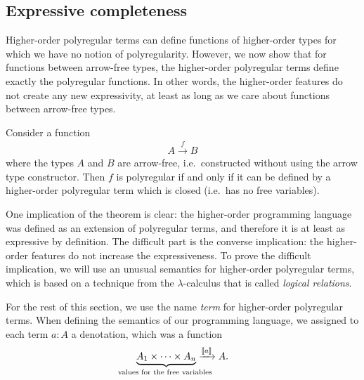 \subsection{Expressive completeness}
\label{sec:expressive-completeness}
Higher-order polyregular terms can define functions of higher-order types for which we have no notion of polyregularity. However, we now show that for functions between arrow-free types, the higher-order polyregular terms define exactly the polyregular functions. In other words, the higher-order features do not create any new expressivity, at least as long as we care about functions between arrow-free types. 




\begin{theorem}\label{thm:higher-order-terms}
    Consider a function 
    \begin{align*}
    A \xrightarrow f B
    \end{align*}
    where the types $A$ and $B$ are arrow-free, i.e.~constructed without using the arrow type constructor. Then $f$ is polyregular if and only if it can be defined by a higher-order polyregular term which is closed (i.e.~has no free variables).
\end{theorem}

One implication of the theorem is clear: the higher-order programming language was defined as an extension of polyregular terms, and therefore it is at least as expressive by definition. The difficult part is the converse implication: the higher-order features do not increase the expressiveness. To prove the difficult implication, we will use an unusual semantics for higher-order polyregular terms, which is based on a technique from the $\lambda$-calculus that is called \emph{logical relations}. 

\newcommand{\semparam}[2]{\sem{#1}_{#2}}
For the rest of this section, we use the name \emph{term} for higher-order polyregular terms. When defining the semantics of our programming language, we assigned to each term  $a : A$ a denotation, which was a function 
\begin{align*}
\myunderbrace{{A_1} \times \cdots \times {A_n}}{values for the free variables} \xrightarrow {\sem a } {A}.
\end{align*}

